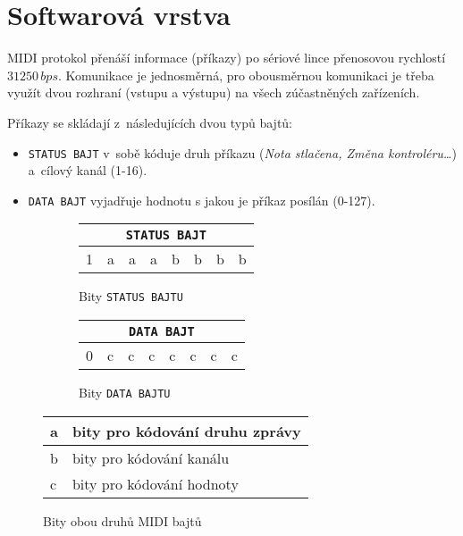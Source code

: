 \section{Softwarová vrstva}\label{chpt:MIDIsw}

\acs{MIDI} protokol přenáší informace (příkazy) po sériové lince přenosovou rychlostí $31 250\,\unit{bps}$. Komunikace je jednosměrná, pro obousměrnou komunikaci je třeba využít dvou rozhraní (vstupu a výstupu) na všech zúčastněných zařízeních. %

Příkazy se skládají z~následujících dvou typů bajtů:
\begin{itemize}
    \item \texttt{STATUS~BAJT} v~sobě kóduje druh příkazu (\emph{Nota stlačena, Změna kontroléru\ldots}) a~cílový kanál (1-16). 
    \item \texttt{DATA~BAJT} vyjadřuje hodnotu s jakou je příkaz posílán (0-127).
\end{itemize}

\begin{figure}[h]
    \centering
    \begin{subfigure}{.4\textwidth}
        \centering
        \begin{tabular}{|c|c|c|c|c|c|c|c|}
            \hline
            \multicolumn{8}{|c|}{\texttt{STATUS BAJT}} \\
            \hline
            1 & a & a & a & b & b & b & b \\ 
            \hline
        \end{tabular}
        \caption{Bity \texttt{STATUS BAJTU}}
        \label{fig:StByteBits}
    \end{subfigure}
    \begin{subfigure}{.4\textwidth}
        \centering
        \begin{tabular}{|c|c|c|c|c|c|c|c|}
            \hline
            \multicolumn{8}{|c|}{\texttt{DATA BAJT}} \\
            \hline
            0 & c & c & c & c & c & c & c \\ 
            \hline
        \end{tabular}
        \caption{Bity \texttt{DATA BAJTU}}
        \label{fig:DtByteBits}
    \end{subfigure}
    \begin{tabular}{l|l}
         a & bity pro kódování druhu zprávy  \\
         \hline
         b & bity pro kódování kanálu \\
         \hline
         c & bity pro kódování hodnoty 
    \end{tabular}
    \caption{Bity obou druhů \acs{MIDI} bajtů \cite{MIDIspecs}}
    \label{fig:MIDIbits}
    
\end{figure}

